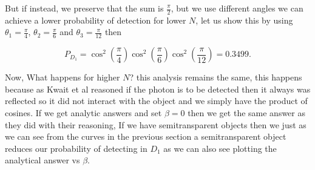 \documentclass[12pt]{book}
\begin{document}
But if instead, we preserve that the sum is $\frac{\pi}{2}$,  but we use different angles we can achieve a lower probability of detection for lower $N$, let us show this by using $\theta_{1}=\frac{\pi}{4}$, $\theta_{2}=\frac{\pi}{6}$ and $\theta_{3}=\frac{\pi}{12}$ then 

\begin{equation}
P_{D_{1}}=\cos^{2}{\left(\frac{\pi}{4} \right)} \cos^{2}{\left(\frac{\pi}{6} \right)} \cos^{2}{\left(\frac{\pi}{12} \right)}=0.3499.
\end{equation}

Now, What happens for higher $N$? this analysis remains the same, this happens because as Kwait et al \cite{exp} reasoned if the photon is to be detected then it always was reflected so it did not interact with the object and we simply have the product of cosines. If we get analytic answers and set $\beta=0$ then we get the same answer as they did with their reasoning, If we have semitransparent objects then we just as we can see from the curves in the previous section a semitransparent object reduces our probability of detecting in $D_{1}$ as we can also see plotting the analytical answer vs $\beta$.
\end{document}
